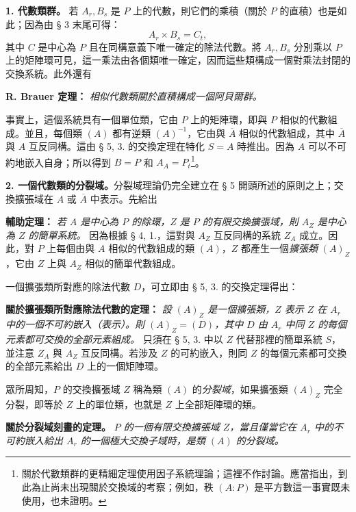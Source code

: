 \documentclass[11pt]{article}
\providecommand{\srcspaced}[1]{#1}
\begin{document}
\noindent\textbf{\srcspaced{1. 代數類群。}} 若 \(A_r,B_s\) 是 \(P\) 上的代數，則它們的乘積（關於 \(P\) 的直積）也是如此；因為由 § 3 末尾可得：
\[
        A_r\times B_s=C_t,
\]
其中 \(C\) 是中心為 \(P\) 且在同構意義下唯一確定的除法代數。將 \(A_r,B_s\) 分別乘以 \(P\) 上的矩陣環可見，這一乘法由各個類唯一確定，因而這些類構成一個對乘法封閉的交換系統。此外還有

\noindent\textbf{\srcspaced{R. Brauer 定理：}} \emph{相似代數類關於直積構成一個阿貝爾群。}

事實上，這個系統具有一個單位類，它由 \(P\) 上的矩陣環，即與 \(P\) 相似的代數組成。並且，每個類 \((A)\) 都有逆類 \((A)^{-1}\)，它由與 \(\overline A\) 相似的代數組成，其中 \(\overline A\) 與 \(A\) 互反同構。這由 § 5, 3. 的交換定理在特化 \(S=A\) 時推出。因為 \(A\) 可以不可約地嵌入自身；所以得到 \(B=P\) 和 \(A_A=P_t\)\footnote{關於代數類群的更精細定理使用因子系統理論；這裡不作討論。應當指出，到此為止尚未出現關於交換域的考察；例如，秩 \((A:P)\) 是平方數這一事實既未使用，也未證明。}。

\noindent\textbf{\srcspaced{2. 一個代數類的分裂域。}}\quad 分裂域理論仍完全建立在 § 5 開頭所述的原則之上；交換擴張域在 \(A\) 或 \(\overline A\) 中表示。先給出

\medskip
\noindent\textbf{\srcspaced{輔助定理：}} \emph{若 \(A\) 是中心為 \(P\) 的除環，\(Z\) 是 \(P\) 的有限交換擴張域，則 \(A_Z\) 是中心為 \(Z\) 的簡單系統。} 因為根據 § 4, 1.，這對與 \(A_Z\) 互反同構的系統 \(Z_A\) 成立。因此，對 \(P\) 上每個由與 \(A\) 相似的代數組成的類 \((A)\)，\(Z\) 都產生一個\emph{擴張類} \((A)_Z\)，它由 \(Z\) 上與 \(A_Z\) 相似的簡單代數組成。

一個擴張類所對應的除法代數 \(D\)，可立即由 § 5, 3. 的交換定理得出：

\noindent\textbf{\srcspaced{關於擴張類所對應除法代數的定理：}} \emph{設 \((A)_Z\) 是一個擴張類，\(Z\) 表示 \(Z\) 在 \(A_r\) 中的一個不可約嵌入（表示）。則 \((A)_Z=(D)\)，其中 \(D\) 由 \(A_r\) 中同 \(Z\) 的每個元素都可交換的全部元素組成。} 只須在 § 5, 3. 中以 \(Z\) 代替那裡的簡單系統 \(S\)，並注意 \(Z_A\) 與 \(A_Z\) 互反同構。若涉及 \(Z\) 的可約嵌入，則同 \(Z\) 的每個元素都可交換的全部元素給出 \(D\) 上的一個矩陣環。

眾所周知，\(P\) 的交換擴張域 \(Z\) 稱為類 \((A)\) 的\emph{分裂域}，如果擴張類 \((A)_Z\) 完全分裂，即等於 \(Z\) 上的單位類，也就是 \(Z\) 上全部矩陣環的類。

\noindent\textbf{\srcspaced{關於分裂域刻畫的定理。}}
\emph{\(P\) 的一個有限交換擴張域 \(Z\)，當且僅當它在 \(A_r\) 中的不可約嵌入給出 \(A_r\) 的一個極大交換子域時，是類 \((A)\) 的分裂域。}
\end{document}
